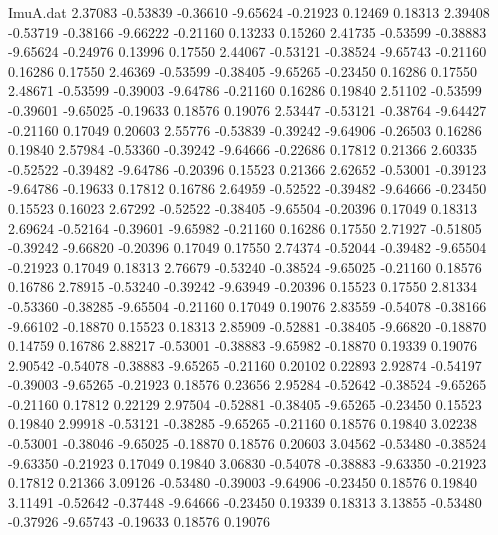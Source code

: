 \begin{filecontents}{ImuA.dat}
   2.37083   -0.53839   -0.36610   -9.65624   -0.21923    0.12469    0.18313
   2.39408   -0.53719   -0.38166   -9.66222   -0.21160    0.13233    0.15260
   2.41735   -0.53599   -0.38883   -9.65624   -0.24976    0.13996    0.17550
   2.44067   -0.53121   -0.38524   -9.65743   -0.21160    0.16286    0.17550
   2.46369   -0.53599   -0.38405   -9.65265   -0.23450    0.16286    0.17550
   2.48671   -0.53599   -0.39003   -9.64786   -0.21160    0.16286    0.19840
   2.51102   -0.53599   -0.39601   -9.65025   -0.19633    0.18576    0.19076
   2.53447   -0.53121   -0.38764   -9.64427   -0.21160    0.17049    0.20603
   2.55776   -0.53839   -0.39242   -9.64906   -0.26503    0.16286    0.19840
   2.57984   -0.53360   -0.39242   -9.64666   -0.22686    0.17812    0.21366
   2.60335   -0.52522   -0.39482   -9.64786   -0.20396    0.15523    0.21366
   2.62652   -0.53001   -0.39123   -9.64786   -0.19633    0.17812    0.16786
   2.64959   -0.52522   -0.39482   -9.64666   -0.23450    0.15523    0.16023
   2.67292   -0.52522   -0.38405   -9.65504   -0.20396    0.17049    0.18313
   2.69624   -0.52164   -0.39601   -9.65982   -0.21160    0.16286    0.17550
   2.71927   -0.51805   -0.39242   -9.66820   -0.20396    0.17049    0.17550
   2.74374   -0.52044   -0.39482   -9.65504   -0.21923    0.17049    0.18313
   2.76679   -0.53240   -0.38524   -9.65025   -0.21160    0.18576    0.16786
   2.78915   -0.53240   -0.39242   -9.63949   -0.20396    0.15523    0.17550
   2.81334   -0.53360   -0.38285   -9.65504   -0.21160    0.17049    0.19076
   2.83559   -0.54078   -0.38166   -9.66102   -0.18870    0.15523    0.18313
   2.85909   -0.52881   -0.38405   -9.66820   -0.18870    0.14759    0.16786
   2.88217   -0.53001   -0.38883   -9.65982   -0.18870    0.19339    0.19076
   2.90542   -0.54078   -0.38883   -9.65265   -0.21160    0.20102    0.22893
   2.92874   -0.54197   -0.39003   -9.65265   -0.21923    0.18576    0.23656
   2.95284   -0.52642   -0.38524   -9.65265   -0.21160    0.17812    0.22129
   2.97504   -0.52881   -0.38405   -9.65265   -0.23450    0.15523    0.19840
   2.99918   -0.53121   -0.38285   -9.65265   -0.21160    0.18576    0.19840
   3.02238   -0.53001   -0.38046   -9.65025   -0.18870    0.18576    0.20603
   3.04562   -0.53480   -0.38524   -9.63350   -0.21923    0.17049    0.19840
   3.06830   -0.54078   -0.38883   -9.63350   -0.21923    0.17812    0.21366
   3.09126   -0.53480   -0.39003   -9.64906   -0.23450    0.18576    0.19840
   3.11491   -0.52642   -0.37448   -9.64666   -0.23450    0.19339    0.18313
   3.13855   -0.53480   -0.37926   -9.65743   -0.19633    0.18576    0.19076

\end{filecontents}
